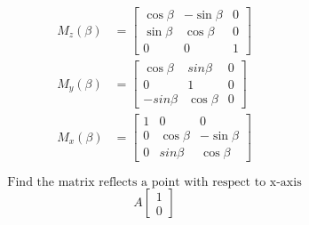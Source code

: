 \documentclass{book}
\begin{document}
\begin{equation}
\begin{aligned}
    M_{z}(\beta) & =\begin{bmatrix}
            \cos\beta & -\sin\beta & 0\\
            \sin\beta & \cos\beta & 0\\   
            0      &   0    & 1  
        \end{bmatrix} \\
    M_{y}(\beta) & =\begin{bmatrix}
            \cos \beta & sin\beta & 0\\
            0      &   1    & 0    \\  
            -sin\beta & \cos\beta & 0   
        \end{bmatrix} \\
    M_{x}(\beta) & =\begin{bmatrix}
            1 &   0      &     0   \\         
            0 & \cos\beta & -\sin\beta\\
            0 & sin\beta& \cos\beta   
        \end{bmatrix} 
\end{aligned}
\end{equation}

\[ \text{Find the matrix reflects a point with respect to x-axis} \]
\[
        A \left[ 
        \begin{array}{c}
        1\\
        0    
        \end{array}
        \right]
\]
\end{document}
